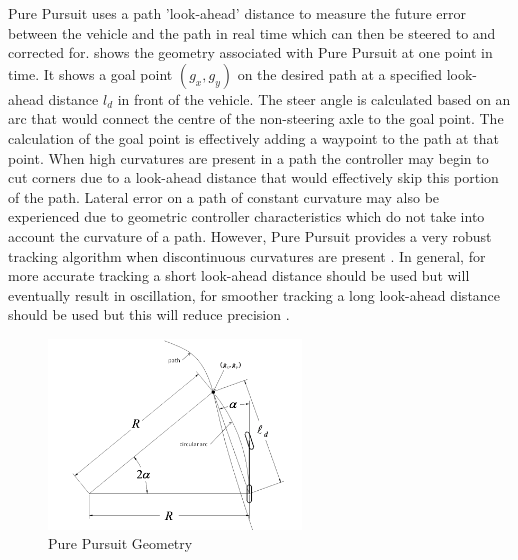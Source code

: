 \documentclass[main.tex]{subfiles}
\begin{document}
Pure Pursuit uses a path 'look-ahead' distance to measure the future error between the vehicle and the path in real time which can then be steered to and corrected for.  shows the geometry associated with Pure Pursuit at one point in time. It shows a goal point $(g_x, g_y)$ on the desired path at a specified look-ahead distance $l_d$ in front of the vehicle. The steer angle is calculated based on an arc that would connect the centre of the non-steering axle to the goal point. The calculation of the goal point is effectively adding a waypoint to the path at that point. When high curvatures are present in a path the controller may begin to cut corners due to a look-ahead distance that would effectively skip this portion of the path. Lateral error on a path of constant curvature may also be experienced due to geometric controller characteristics which do not take into account the curvature of a path. However, Pure Pursuit provides a very robust tracking algorithm when discontinuous curvatures are present \parencite{snider2009}. In general, for more accurate tracking a short look-ahead distance should be used but will eventually result in oscillation, for smoother tracking a long look-ahead distance should be used but this will reduce precision \parencite{snider2009}.
\begin{figure}[ht]
\includegraphics[width=0.6\textwidth]{3-LiteratureReview/purePursuitGoal.png}
\centering
\caption[Pure Pursuit Geometry]{Pure Pursuit Geometry \parencite{snider2009}} 
\end{figure}
\end{document}
